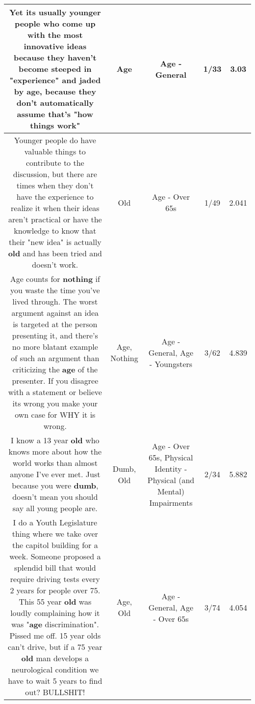 \documentclass[11pt]{article}
\newlength\mylength
\begin{document}
\begin{center}
\begin{longtable}{|C{.65\mylength}|C{.30\mylength}|C{.12\mylength}|C{.12\mylength}|C{.12\mylength}|}
  \small Yet its usually younger people who come up with the most innovative ideas because they haven't become steeped in "experience" and jaded by \textbf{age}, because they don't automatically assume that's "how things work"\normalsize   & Age & Age - General & 1/33 & 3.03 \\  \hline
  \small Younger people do have valuable things to contribute to the discussion, but there are times when they don't have the experience to realize it when their ideas aren't practical or have the knowledge to know that their "new idea" is actually \textbf{old} and has been tried and doesn't work.\normalsize   & Old & Age - Over 65s & 1/49 & 2.041 \\  \hline
  \small Age counts for \textbf{nothing} if you waste the time you've lived through. The worst argument against an idea is targeted at the person presenting it, and there's no more blatant example of such an argument than criticizing the \textbf{age} of the presenter. If you disagree with a statement or believe its wrong you make your own case for WHY it is wrong.\normalsize   & Age, Nothing & Age - General, Age - Youngsters & 3/62 & 4.839 \\  \hline
  \small I know a 13 year \textbf{old} who knows more about how the world works than almost anyone I've ever met. Just because you were \textbf{dumb}, doesn't mean you should say all young people are.\normalsize   & Dumb, Old & Age - Over 65s, Physical Identity - Physical (and Mental) Impairments & 2/34 & 5.882 \\  \hline
  \small I do a Youth Legislature thing where we take over the capitol building for a week. Someone proposed a splendid bill that would require driving tests every 2 years for people over 75. This 55 year \textbf{old} was loudly complaining how it was "\textbf{age} discrimination". Pissed me off. 15 year olds can't drive, but if a 75 year \textbf{old} man develops a neurological condition we have to wait 5 years to find out? BULLSHIT!\normalsize   & Age, Old & Age - General, Age - Over 65s & 3/74 & 4.054 \\  \hline

\end{longtable}
\end{center}
\end{document}
